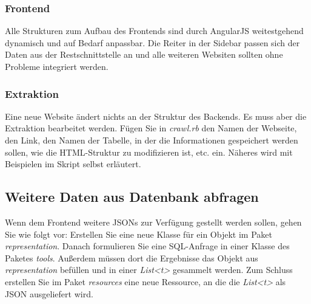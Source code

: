 \documentclass{article}
\begin{document}
	\subsubsection{Frontend}
	Alle Strukturen zum Aufbau des Frontends sind durch AngularJS weitestgehend dynamisch und auf Bedarf anpassbar. Die Reiter in der Sidebar passen sich der Daten aus der Restschnittstelle an und alle weiteren Websiten sollten ohne Probleme integriert werden.
	\subsubsection{Extraktion}
	Eine neue Website ändert nichts an der Struktur des Backends. Es muss aber die Extraktion bearbeitet werden. Fügen Sie in \textit{crawl.rb} den Namen der Webseite, den Link, den Namen der Tabelle, in der die Informationen gespeichert werden sollen, wie die HTML-Struktur zu modifizieren ist, etc. ein. Näheres wird mit Beispielen im Skript selbst erläutert.
	\subsection{Weitere Daten aus Datenbank abfragen}
	Wenn dem Frontend weitere JSONs zur Verfügung gestellt werden sollen, gehen Sie wie folgt vor: Erstellen Sie eine neue Klasse für ein Objekt im Paket \textit{representation}. Danach formulieren Sie eine SQL-Anfrage in einer Klasse des Paketes \textit{tools}. Außerdem müssen dort die Ergebnisse das Objekt aus \textit{representation} befüllen und in einer \textit{List<t>} gesammelt werden. Zum Schluss erstellen Sie im Paket \textit{resources} eine neue Ressource, an die die \textit{List<t>} als JSON ausgeliefert wird.
	\newpage
\end{document}
